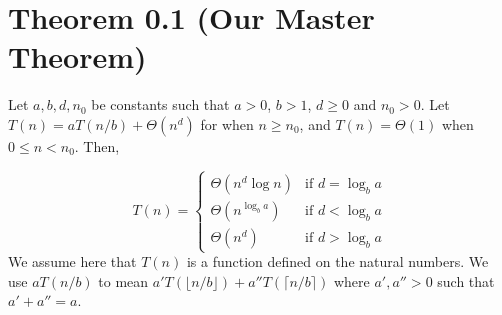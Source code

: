 \documentclass{article}
\begin{document}
\section*{Theorem 0.1 (Our Master Theorem)}
Let $a, b, d, n_0$ be constants such that $a > 0$, $b > 1$, $d \ge 0$ and $n_0 > 0$. Let $T(n) = aT(n/b) + \Theta(n^d)$ for when $n \ge n_0$, and $T(n) = \Theta(1)$ when $0 \le n < n_0$. Then,

\[
T(n) = \begin{cases}
\Theta(n^d \log n) & \text{if } d = \log_b a \\
\Theta(n^{\log_b a}) & \text{if } d < \log_b a \\
\Theta(n^d) & \text{if } d > \log_b a
\end{cases}
\]
We assume here that $T(n)$ is a function defined on the natural numbers. We use $aT(n/b)$ to mean $a' T(\lfloor n/b \rfloor) + a'' T(\lceil n/b \rceil)$ where $a', a'' > 0$ such that $a' + a'' = a$.
\end{document}
